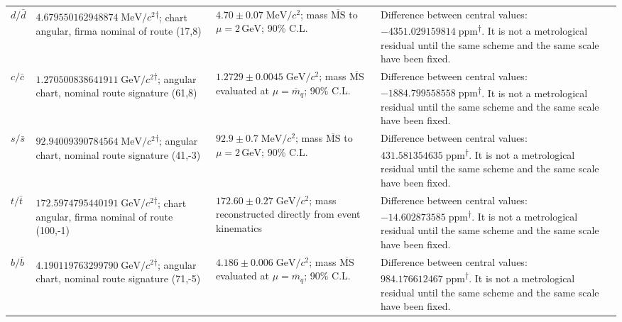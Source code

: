 \begin{longtable}{@{}>{\raggedright\arraybackslash}p{}>{\raggedright\arraybackslash}p{}>{\raggedright\arraybackslash}p{}>{\raggedright\arraybackslash}p{}@{}}
$d/\bar d$ & $4.679550\allowbreak{}162948\allowbreak{}874\;\mathrm{MeV}/c^2$\textsuperscript{\(\dagger\)}; chart angular, firma nominal of route (17,8) & $4.70\pm0.07\;\mathrm{MeV}/c^2$; mass $\overline{\mathrm{MS}}$ to $\mu=2\,\mathrm{GeV}$; 90\% C.L. & Difference between central values: $-4351.029159\allowbreak{}814\;\mathrm{ppm}$\textsuperscript{\(\dagger\)}. It is not a metrological residual until the same scheme and the same scale have been fixed. \\
$c/\bar c$ & $1.270500\allowbreak{}838641\allowbreak{}911\;\mathrm{GeV}/c^2$\textsuperscript{\(\dagger\)}; angular chart, nominal route signature (61,8) & $1.2729\pm0.0045\;\mathrm{GeV}/c^2$; mass $\overline{\mathrm{MS}}$ evaluated at $\mu=\overline{m}_q$; 90\% C.L. & Difference between central values: $-1884.799558\allowbreak{}558\;\mathrm{ppm}$\textsuperscript{\(\dagger\)}. It is not a metrological residual until the same scheme and the same scale have been fixed. \\
$s/\bar s$ & $92.940093\allowbreak{}907845\allowbreak{}64\;\mathrm{MeV}/c^2$\textsuperscript{\(\dagger\)}; angular chart, nominal route signature (41,-3) & $92.9\pm0.7\;\mathrm{MeV}/c^2$; mass $\overline{\mathrm{MS}}$ to $\mu=2\,\mathrm{GeV}$; 90\% C.L. & Difference between central values: $431.581354\allowbreak{}635\;\mathrm{ppm}$\textsuperscript{\(\dagger\)}. It is not a metrological residual until the same scheme and the same scale have been fixed. \\
$t/\bar t$ & $172.597479\allowbreak{}544019\allowbreak{}1\;\mathrm{GeV}/c^2$\textsuperscript{\(\dagger\)}; chart angular, firma nominal of route (100,-1) & $172.60\pm0.27\;\mathrm{GeV}/c^2$; mass reconstructed directly from event kinematics & Difference between central values: $-14.602873\allowbreak{}585\;\mathrm{ppm}$\textsuperscript{\(\dagger\)}. It is not a metrological residual until the same scheme and the same scale have been fixed. \\
$b/\bar b$ & $4.190119\allowbreak{}763299\allowbreak{}790\;\mathrm{GeV}/c^2$\textsuperscript{\(\dagger\)}; angular chart, nominal route signature (71,-5) & $4.186\pm0.006\;\mathrm{GeV}/c^2$; mass $\overline{\mathrm{MS}}$ evaluated at $\mu=\overline{m}_q$; 90\% C.L. & Difference between central values: $984.176612\allowbreak{}467\;\mathrm{ppm}$\textsuperscript{\(\dagger\)}. It is not a metrological residual until the same scheme and the same scale have been fixed. \\

\end{longtable}
